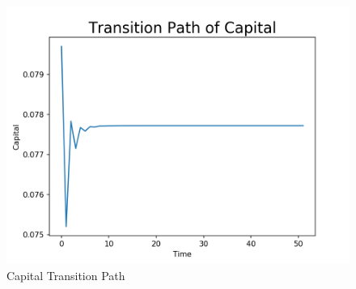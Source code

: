 \documentclass{article}
\begin{document}
	\begin{figure}[!h]
		\centering
		\caption{Capital Transition Path}
		\includegraphics[width = \textwidth]{ktrans}
	\end{figure} 
\end{document}
